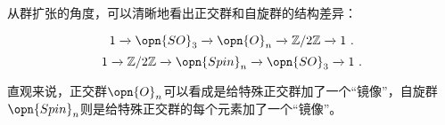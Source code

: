\begin{example}{}
从群扩张的角度，可以清晰地看出正交群和自旋群的结构差异：

\begin{equation}
    1\xrightarrow{}\opn{SO}_3\xrightarrow{}\opn{O}_n\xrightarrow{}\mathbb{Z}/2\mathbb{Z}\xrightarrow{}1~. 
\end{equation}
\begin{equation}
    1\xrightarrow{}\mathbb{Z}/2\mathbb{Z}\xrightarrow{}\opn{Spin}_n\xrightarrow{}\opn{SO}_3\xrightarrow{}1~. 
\end{equation}

直观来说，正交群$\opn{O}_n$可以看成是给特殊正交群加了一个“镜像”，自旋群$\opn{Spin}_n$则是给特殊正交群的每个元素加了一个“镜像”。

\end{example}






























